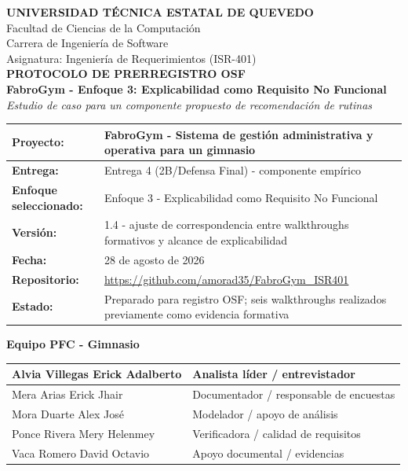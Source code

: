 \documentclass[9pt,a4paper]{extarticle}
\author{}
\date{}
\begin{document}
\thispagestyle{empty}
\begin{center}
{\Large\bfseries UNIVERSIDAD TÉCNICA ESTATAL DE QUEVEDO}\\[6pt]
{\normalsize Facultad de Ciencias de la Computación}\\[3pt]
{\normalsize Carrera de Ingeniería de Software}\\[14pt]
{\normalsize Asignatura: Ingeniería de Requerimientos (ISR-401)}\\[18pt]

{\LARGE\bfseries PROTOCOLO DE PRERREGISTRO OSF}\\[8pt]
{\large\bfseries FabroGym - Enfoque 3: Explicabilidad como Requisito No Funcional}\\[5pt]
{\normalsize\itshape Estudio de caso para un componente propuesto de recomendación de rutinas}\\[14pt]
\end{center}

\begin{center}
\begin{tabular}{|>{\bfseries}p{}|p{}|}
\hline
Proyecto: & FabroGym - Sistema de gestión administrativa y operativa para un gimnasio \\ \hline
Entrega: & Entrega 4 (2B/Defensa Final) - componente empírico \\ \hline
Enfoque seleccionado: & Enfoque 3 - Explicabilidad como Requisito No Funcional \\ \hline
Versión: & 1.4 - ajuste de correspondencia entre walkthroughs formativos y alcance de explicabilidad \\ \hline
Fecha: & 28 de agosto de 2026 \\ \hline
Repositorio: & \url{https://github.com/amorad35/FabroGym_ISR401} \\ \hline
Estado: & Preparado para registro OSF; seis walkthroughs realizados previamente como evidencia formativa \\ \hline
\end{tabular}
\end{center}

\vspace{8pt}
\begin{center}
{\bfseries Equipo PFC - Gimnasio}\\[5pt]
\begin{tabular}{|p{}|p{}|}
\hline
Alvia Villegas Erick Adalberto & Analista líder / entrevistador \\ \hline
Mera Arias Erick Jhair & Documentador / responsable de encuestas \\ \hline
Mora Duarte Alex José & Modelador / apoyo de análisis \\ \hline
Ponce Rivera Mery Helenmey & Verificadora / calidad de requisitos \\ \hline
Vaca Romero David Octavio & Apoyo documental / evidencias \\ \hline
\end{tabular}
\end{center}
\end{document}
